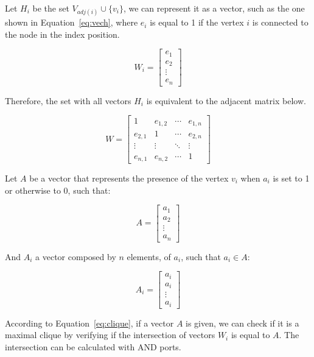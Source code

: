 \documentclass[a4paper,12pt]{article}
\begin{document}
Let $H_i$ be the set $V_{adj(i)} \cup \{v_i\}$, we can represent it as a vector, such as the one shown in Equation~\ref{eq:vech}, where $e_i$ is equal to 1 if the vertex $i$ is connected to the node in the index position.

\begin{equation}\label{eq:vech}
W_i = 
	\begin{bmatrix}
		e_{1} \\
		e_{2} \\
		\vdots  \\
		e_{n}
	\end{bmatrix}
\end{equation}

Therefore, the set with all vectors $H_i$ is equivalent to the adjacent matrix below.

\begin{equation}
W = 
	\begin{bmatrix}
	1 & e_{1,2} & \cdots & e_{1,n} \\
	e_{2,1} & 1 & \cdots & e_{2,n} \\
	\vdots  & \vdots  & \ddots & \vdots  \\
	e_{n,1} & e_{n,2} & \cdots & 1 
	\end{bmatrix}
\end{equation}

Let $A$ be a vector that represents the presence of the vertex $v_i$ when $a_i$ is set to 1 or otherwise to 0, such that:

\begin{equation}
A = 
\begin{bmatrix}
a_{1} \\
a_{2} \\
\vdots  \\
a_{n}
\end{bmatrix}
\end{equation}

And $A_i$ a vector composed by $n$ elements, of $a_i$, such that $a_i \in A$:

\begin{equation}
A_i = 
\begin{bmatrix}
a_{i} \\
a_{i} \\
\vdots  \\
a_{i}
\end{bmatrix}
\end{equation}

According to Equation~\ref{eq:clique}, if a vector $A$ is given, we can check if it is a maximal clique by verifying if the intersection of vectors $W_i$ is equal to $A$. The intersection can be calculated with AND ports.
\end{document}
